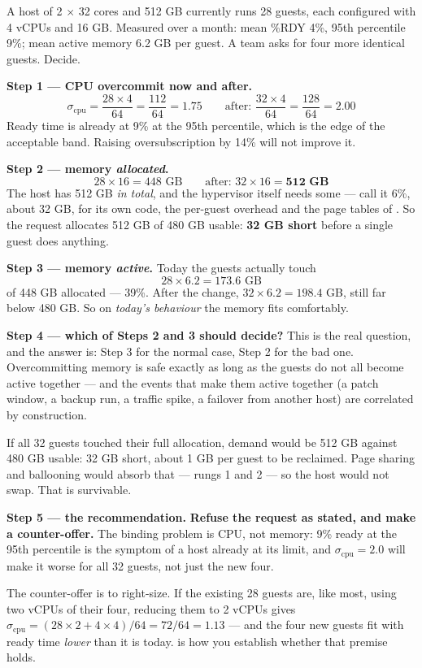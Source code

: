 \begin{worked}
A host of 2 $\times$ 32 cores and 512 GB currently runs 28 guests, each
configured with 4 vCPUs and 16 GB. Measured over a month: mean \%RDY 4\%,
95th percentile 9\%; mean active memory 6.2 GB per guest. A team asks for four
more identical guests. Decide.

\smallskip
\textbf{Step 1 --- CPU overcommit now and after.}
\[ \sigma_{\text{cpu}} = \frac{28 \times 4}{64} = \frac{112}{64}
   = \mathbf{1.75} \qquad\text{after: } \frac{32 \times 4}{64}
   = \frac{128}{64} = \mathbf{2.00} \]
Ready time is already at 9\% at the 95th percentile, which is the edge of the
acceptable band. Raising oversubscription by 14\% will not improve it.

\smallskip
\textbf{Step 2 --- memory \emph{allocated}.}
\[ 28 \times 16 = 448 \text{ GB} \qquad\text{after: } 32 \times 16
   = \mathbf{512 \text{ GB}} \]
The host has 512 GB \emph{in total}, and the hypervisor itself needs some ---
call it 6\%, about 32 GB, for its own code, the per-guest overhead and the page
tables of . So the request allocates 512 GB of 480 GB usable:
\textbf{32 GB short} before a single guest does anything.

\smallskip
\textbf{Step 3 --- memory \emph{active}.} Today the guests actually touch
\[ 28 \times 6.2 = 173.6 \text{ GB} \]
of 448 GB allocated --- 39\%. After the change, $32 \times 6.2 = 198.4$ GB,
still far below 480 GB. So on \emph{today's behaviour} the memory fits
comfortably.

\smallskip
\textbf{Step 4 --- which of Steps 2 and 3 should decide?} This is the real
question, and the answer is: Step 3 for the normal case, Step 2 for the bad
one. Overcommitting memory is safe exactly as long as the guests do not all
become active together --- and the events that make them active together
(a patch window, a backup run, a traffic spike, a failover from another host)
are correlated by construction.

\smallskip
If all 32 guests touched their full allocation, demand would be 512 GB against
480 GB usable: 32 GB short, about 1 GB per guest to be reclaimed. Page sharing
and ballooning would absorb that --- rungs 1 and 2 --- so the host would not
swap. That is survivable.

\smallskip
\textbf{Step 5 --- the recommendation.} \textbf{Refuse the request as stated,
and make a counter-offer.} The binding problem is CPU, not memory: 9\% ready at
the 95th percentile is the symptom of a host already at its limit, and
$\sigma_{\text{cpu}} = 2.0$ will make it worse for all 32 guests, not just the
new four.

\smallskip
The counter-offer is to right-size. If the existing 28 guests are, like most,
using two vCPUs of their four, reducing them to 2 vCPUs gives
$\sigma_{\text{cpu}} = (28 \times 2 + 4 \times 4)/64 = 72/64 = 1.13$ --- and
the four new guests fit with ready time \emph{lower} than it is today.
 is how you establish whether that premise holds.
\end{worked}

